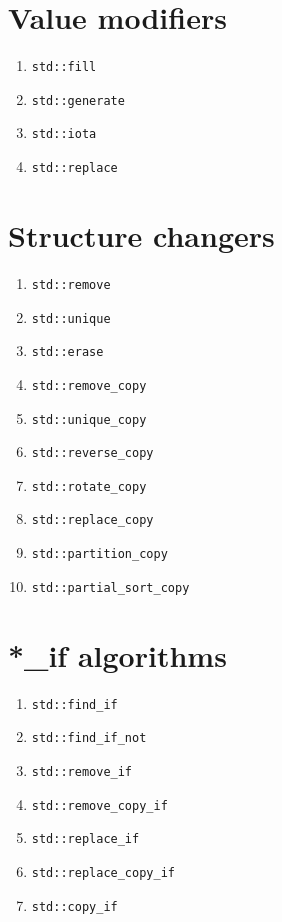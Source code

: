 \documentclass{article}
\begin{document}
\begin{multicols}{3}
\section{Value modifiers}
\begin{enumerate}[resume]
\setlength\itemsep{0em}
\item \texttt{std::fill}
\item \texttt{std::generate}
\item \texttt{std::iota}
\item \texttt{std::replace}
\end{enumerate}

\section{Structure changers}
\begin{enumerate}[resume]
\setlength\itemsep{0em}
\item \texttt{std::remove}
\item \texttt{std::unique}
\item \texttt{std::erase}
\item \texttt{std::remove\_copy}
\item \texttt{std::unique\_copy}
\item \texttt{std::reverse\_copy}
\item \texttt{std::rotate\_copy}
\item \texttt{std::replace\_copy}
\item \texttt{std::partition\_copy}
\item \texttt{std::partial\_sort\_copy}
\end{enumerate}

\section{*\_if algorithms}
\begin{enumerate}[resume]
\setlength\itemsep{0em}
\item \texttt{std::find\_if}
\item \texttt{std::find\_if\_not}
\item \texttt{std::remove\_if}
\item \texttt{std::remove\_copy\_if}
\item \texttt{std::replace\_if}
\item \texttt{std::replace\_copy\_if}
\item \texttt{std::copy\_if}
\end{enumerate}


\end{multicols}
\end{document}
